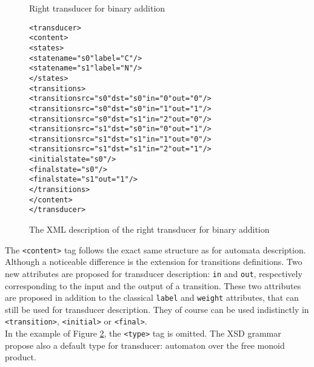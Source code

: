 \documentclass[a4paper]{article}
\begin{document}
\begin{figure}[h]
  \begin{center}
\ShowFrame
\ShowGrid
{}
\caption{Right transducer for binary addition}
\label{binadd}
  \end{center}
\end{figure}

{\small
\begin{figure}[h]
  \begin{center}
\begin{alltt}
<transducer>
  <content>
    <states>
       <state name="s0" label="C"/>
       <state name="s1" label="N"/>
    </states>
    <transitions>
       <transition src="s0" dst="s0" in="0" out="0"/>
       <transition src="s0" dst="s0" in="1" out="1"/>
       <transition src="s0" dst="s1" in="2" out="0"/>
       <transition src="s1" dst="s0" in="0" out="1"/>
       <transition src="s1" dst="s1" in="1" out="0"/>
       <transition src="s1" dst="s1" in="2" out="1"/>
       <initial state="s0"/>
       <final state="s0"/>
       <final state="s1" out="1"/>
    </transitions>
  </content>
</transducer>
\end{alltt}

\caption{The XML description of the right transducer for binary addition}
\label{binaddxml}
  \end{center}
\end{figure}

}

The \verb|<content>| tag follows the exact same structure as for automata
description. Although a noticeable difference is the extension for
transitions definitions. Two new attributes are proposed for transducer
description: \verb|in| and \verb|out|, respectively corresponding to
the input and the output of a transition. These two attributes are
proposed in addition to the classical \verb|label| and \verb|weight|
attributes, that can still be used for transducer description. They of
course can be used indistinctly in \verb|<transition>|,
\verb|<initial>| or \verb|<final>|. \\


In the example of Figure \ref{binaddxml}, the \verb|<type>| tag is
omitted. The XSD grammar propose also a default type for transducer:
automaton over the free monoid product.
\end{document}
